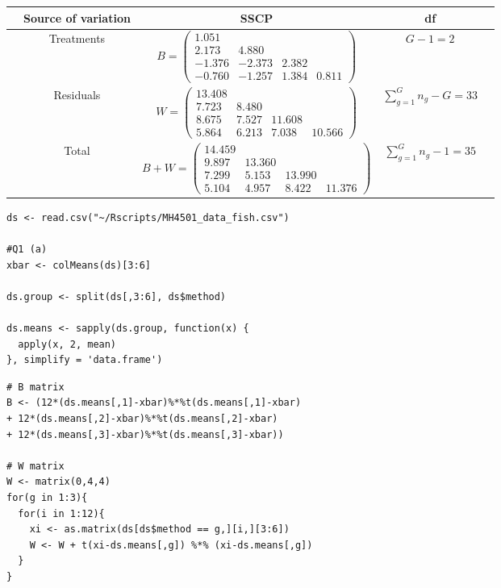 \documentclass[12pt]{article}
\newenvironment{solution}[2][Solution]{\begin{trivlist}
\item[\hskip \labelsep {\bfseries #1}\hskip \labelsep {\bfseries #2.}]}{\end{trivlist}}
\begin{document}
\begin{solution}[(a) Solution] \\ 
\flushleft{\ }
\begin{center}
  \begin{tabular*}{\textwidth}{@{\extracolsep{\fill}} ccccc @{}} \hline \hline
    & Source of variation & SSCP & df & \\ \hline 
    & Treatments & $B=\left(
    \begin{array}{cccc}
      1.051 & & & \\
      2.173 & 4.880 & & \\
      -1.376 & -2.373 & 2.382 & \\
      -0.760 & -1.257 & 1.384 & 0.811
    \end{array} \right)$ & $G-1=2$  & \\
    & Residuals & $W=\left(
    \begin{array}{cccc}
      13.408 & & & \\
      7.723 & 8.480 & & \\
      8.675 & 7.527 & 11.608 & \\
      5.864 & 6.213 & 7.038 & 10.566
    \end{array} \right)$ & $\sum_{g=1}^G n_g - G=33$  & \\ \hline
    & Total & $B+W=\left(
    \begin{array}{cccc}
      14.459 & & & \\
      9.897 & 13.360 & & \\
      7.299 & 5.153 & 13.990 & \\
      5.104 & 4.957 & 8.422 & 11.376
    \end{array} \right)$ & $\sum_{g=1}^G n_g - 1=35$  & \\ \hline \hline
  \end{tabular*}
\end{center}

\begin{lstlisting}[caption=R code for Q1 (a)]
ds <- read.csv("~/Rscripts/MH4501_data_fish.csv")

#Q1 (a)
xbar <- colMeans(ds)[3:6]

ds.group <- split(ds[,3:6], ds$method)

ds.means <- sapply(ds.group, function(x) {
  apply(x, 2, mean)
}, simplify = 'data.frame')
\end{lstlisting}

\newpage
\begin{lstlisting}
# B matrix
B <- (12*(ds.means[,1]-xbar)%*%t(ds.means[,1]-xbar)
+ 12*(ds.means[,2]-xbar)%*%t(ds.means[,2]-xbar)
+ 12*(ds.means[,3]-xbar)%*%t(ds.means[,3]-xbar))

# W matrix
W <- matrix(0,4,4)
for(g in 1:3){
  for(i in 1:12){
    xi <- as.matrix(ds[ds$method == g,][i,][3:6])
    W <- W + t(xi-ds.means[,g]) %*% (xi-ds.means[,g])
  }
}
\end{lstlisting}
\end{solution}
\end{document}

